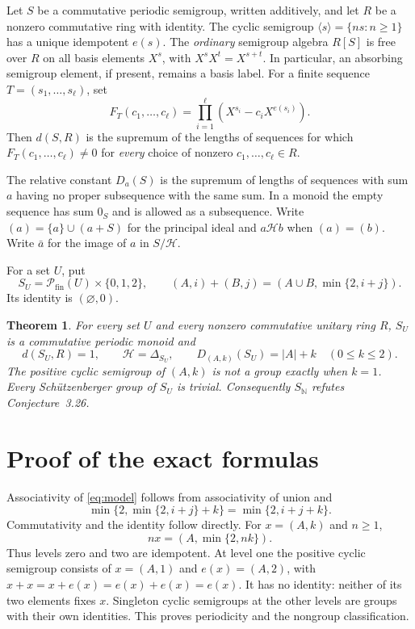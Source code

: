 \documentclass[11pt]{article}
\newtheorem{theorem}{Theorem}
\newcommand{\Pf}{\mathcal P_{\mathrm{fin}}}
\newcommand{\HH}{\mathcal H}
\begin{document}
Let $S$ be a commutative periodic semigroup, written additively, and let
$R$ be a nonzero commutative ring with identity. The cyclic semigroup
$\langle s\rangle=\{ns:n\geq1\}$ has a unique idempotent $e(s)$.
The \emph{ordinary} semigroup algebra $R[S]$ is free over $R$ on all basis
elements $X^s$, with $X^sX^t=X^{s+t}$. In particular, an absorbing
semigroup element, if present, remains a basis label.
For a finite sequence $T=(s_1,\ldots,s_\ell)$, set
\[
 F_T(c_1,\ldots,c_\ell)
 =\prod_{i=1}^{\ell}(X^{s_i}-c_iX^{e(s_i)}).
\]
Then $d(S,R)$ is the supremum of the lengths of sequences for which
$F_T(c_1,\ldots,c_\ell)\ne0$ for \emph{every} choice of nonzero
$c_1,\ldots,c_\ell\in R$.

The relative constant $D_a(S)$ is the supremum of lengths of sequences
with sum $a$ having no proper subsequence with the same sum. In a monoid
the empty sequence has sum $0_S$ and is allowed as a subsequence.
Write $(a)=\{a\}\cup(a+S)$ for the principal ideal and
$a\HH b$ when $(a)=(b)$. Write $\bar a$ for the image of $a$ in
$S/\HH$.

For a set $U$, put
\begin{equation}\label{eq:model}
 S_U=\Pf(U)\times\{0,1,2\},\qquad
 (A,i)+(B,j)=(A\cup B,\min\{2,i+j\}).
\end{equation}
Its identity is $(\varnothing,0)$.

\begin{theorem}\label{thm:main}
For every set $U$ and every nonzero commutative unitary ring $R$,
$S_U$ is a commutative periodic monoid and
\begin{equation}\label{eq:exact}
 d(S_U,R)=1,\qquad \HH=\Delta_{S_U},\qquad
 D_{(A,k)}(S_U)=|A|+k\quad(0\leq k\leq2).
\end{equation}
The positive cyclic semigroup of $(A,k)$ is not a group exactly when
$k=1$. Every Sch\"utzenberger group of $S_U$ is trivial.
Consequently $S_{\mathbb N}$ refutes Conjecture~3.26.
\end{theorem}

\section{Proof of the exact formulas}

Associativity of \eqref{eq:model} follows from associativity of union and
\[
 \min\{2,\min\{2,i+j\}+k\}=\min\{2,i+j+k\}.
\]
Commutativity and the identity follow directly. For $x=(A,k)$ and $n\geq1$,
\[
 nx=(A,\min\{2,nk\}).
\]
Thus levels zero and two are idempotent. At level one the positive cyclic
semigroup consists of $x=(A,1)$ and $e(x)=(A,2)$, with
$x+x=x+e(x)=e(x)+e(x)=e(x)$. It has no identity: neither of its two
elements fixes $x$. Singleton cyclic semigroups at the other levels are
groups with their own identities. This proves periodicity and the
nongroup classification.
\end{document}
